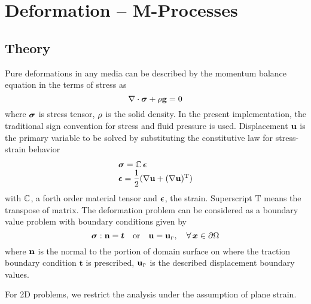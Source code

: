 \chapter{Deformation -- M-Processes}
\section{Theory}

Pure deformations in any media  can be described by the momentum
balance equation in the terms of stress as
\begin{equation}
\nabla \cdot \bm \sigma + \rho\mathbf g = 0
\label{eq:momb}
\end{equation}
where $\bm \sigma$ is stress tensor, $\rho$ is the solid density. In the present implementation, the traditional sign
convention for stress and fluid pressure is used. Displacement $\mathbf u$ is the primary variable to be solved by
substituting the constitutive law for stress-strain behavior
\begin{equation}
\begin{array}{l}
 \bm \sigma = \mathbb C\, \bm \epsilon\\
  \bm \epsilon = \dfrac{1}{2}(\nabla \mathbf u+(\nabla \mathbf u)^{\mathrm T})
 \end{array}
 \label{eq:strstr}
\end{equation}
with $\mathbb C$, a forth order material tensor and $\bm \epsilon$, the
strain. Superscript $\mathrm T$ means the transpose of matrix. The
deformation problem can be considered as a boundary value problem
with boundary conditions given by
\begin{equation}
\bm \sigma : \mathbf n = \bm t
\quad \mbox{or} \quad
\mathbf u = \mathbf u_{\scriptscriptstyle{\Gamma}},
\quad \forall\,\bm x \in
\partial \Omega
\label{eq:debc}
\end{equation}
where $\mathbf n$ is the normal to the portion of domain surface on where
the traction boundary condition $\bm t$ is prescribed, $\mathbf u_{\scriptscriptstyle{\Gamma}}$ is the
 described displacement boundary values.

For 2D problems, we restrict the analysis under the
assumption of plane strain.















